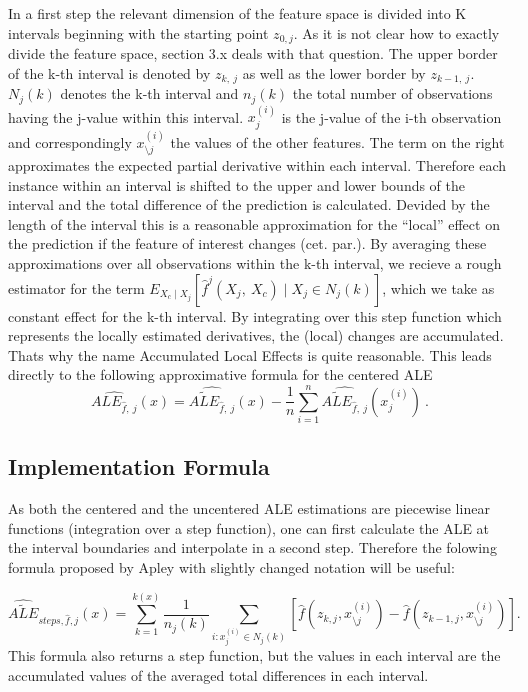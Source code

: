 \documentclass[]{krantz}
\begin{document}
In a first step the relevant dimension of the feature space is divided
into K intervals beginning with the starting point \(z_{0, j}\). As it
is not clear how to exactly divide the feature space, section 3.x deals
with that question. The upper border of the k-th interval is denoted by
\(z_{k, ~j}\) as well as the lower border by \(z_{k-1, ~j}\). \(N_j(k)\)
denotes the k-th interval and \(n_j(k)\) the total number of
observations having the j-value within this interval. \(x_j^{(i)}\) is
the j-value of the i-th observation and correspondingly
\(x_{\setminus j}^{(i)}\) the values of the other features. The term on
the right approximates the expected partial derivative within each
interval. Therefore each instance within an interval is shifted to the
upper and lower bounds of the interval and the total difference of the
prediction is calculated. Devided by the length of the interval this is
a reasonable approximation for the ``local'' effect on the prediction if
the feature of interest changes (cet. par.). By averaging these
approximations over all observations within the k-th interval, we
recieve a rough estimator for the term
\(E_{X_c \mid X_j} [\hat{f}^j(X_j,~X_c)\mid X_j \in N_j(k)]\), which we
take as constant effect for the k-th interval. By integrating over this
step function which represents the locally estimated derivatives, the
(local) changes are accumulated. Thats why the name Accumulated Local
Effects is quite reasonable. This leads directly to the following
approximative formula for the centered ALE
\[   \widehat{ALE_{\hat{f},~j}}(x) = \widehat{\widetilde{ALE}_{\hat{f},~j}}(x) - \frac{1}{n} \sum_{i=1}^{n} \widehat{\widetilde{ALE}_{\hat{f},~j}}(x_j^{(i)})~. 
 \]

\subsection{Implementation Formula}\label{implementation-formula}

As both the centered and the uncentered ALE estimations are piecewise
linear functions (integration over a step function), one can first
calculate the ALE at the interval boundaries and interpolate in a second
step. Therefore the folowing formula proposed by Apley with slightly
changed notation will be useful:

\[  \widehat{\widetilde{ALE}}_{steps, \hat{f},j}(x) =  \sum_{k=1}^{k(x)}   \frac{1}{n_j(k)}\sum_{i:x_j^{(i)}\in N_j(k)} [\hat{f}(z_{k,j}, x_{\setminus j}^{(i)})-\hat{f}(z_{k-1,j}, x_{\setminus j}^{(i)})].  \]
This formula also returns a step function, but the values in each
interval are the accumulated values of the averaged total differences in
each interval.
\end{document}
